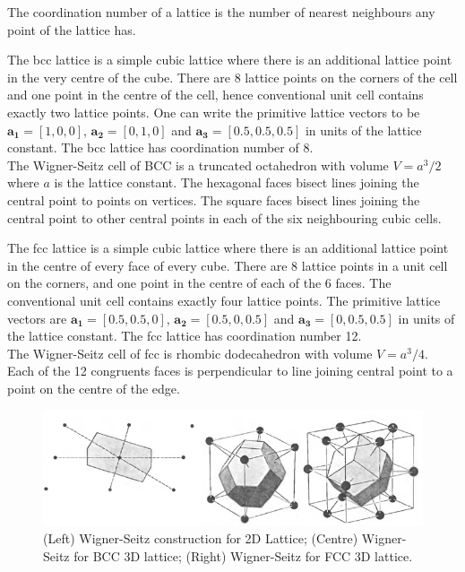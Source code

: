 \documentclass[a4paper]{article}
\begin{document}
\begin{defi}
The coordination number of a lattice is the number of nearest neighbours any point of the lattice has.
\end{defi}
\begin{Note}
The bcc lattice is a simple cubic lattice where there is an additional lattice point in the very centre of the cube. There are 8 lattice points on the corners of the cell and one point in the centre of the cell, hence conventional unit cell contains exactly two lattice points. One can write the primitive lattice vectors to be $\mathbf{a_1}=[1,0,0]$, $\mathbf{a_2}=[0,1,0]$ and $\mathbf{a_3}=[0.5,0.5,0.5]$ in units of the lattice constant. The bcc lattice has coordination number of 8.\\[5pt]
The Wigner-Seitz cell of BCC is a truncated octahedron with volume $V=a^3/2$ where $a$ is the lattice constant. The hexagonal faces bisect lines joining the central point to points on vertices. The square faces bisect lines joining the central point to other central points in each of the six neighbouring cubic cells.
\end{Note}
\begin{Note}
The fcc lattice is a simple cubic lattice where there is an additional lattice point in the centre of every face of every cube. There are 8 lattice points in a unit cell on the corners, and one point in the centre of each of the 6 faces. The conventional unit cell contains exactly four lattice points. The primitive lattice vectors are $\mathbf{a_1}=[0.5,0.5,0]$, $\mathbf{a_2}=[0.5,0,0.5]$ and $\mathbf{a_3}=[0,0.5,0.5]$ in units of the lattice constant. The fcc lattice has coordination number 12.\\[5pt]
The Wigner-Seitz cell of fcc is rhombic dodecahedron with volume $V=a^3/4$. Each of the 12 congruents faces is perpendicular to line joining central point to a point on the centre of the edge.
\end{Note}
\begin{figure}[H]
    \centering
    \includegraphics[width=\linewidth]{WignerSeitz.PNG}
    \caption{(Left) Wigner-Seitz construction for 2D Lattice; (Centre) Wigner-Seitz for BCC 3D lattice; (Right) Wigner-Seitz for FCC 3D lattice. \cite{ashcroft1976solid}}
\end{figure}
\newpage
\end{document}
